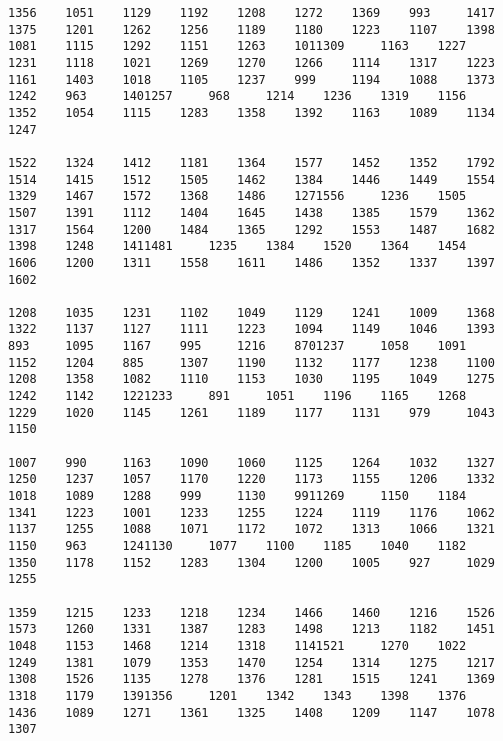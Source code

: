 \begin{verbatim}
1356    1051    1129    1192    1208    1272    1369    993     1417    1375    1201    1262    1256    1189    1180    1223    1107    1398    1081    1115    1292    1151    1263    1011309     1163    1227    1231    1118    1021    1269    1270    1266    1114    1317    1223    1161    1403    1018    1105    1237    999     1194    1088    1373    1242    963     1401257     968     1214    1236    1319    1156    1352    1054    1115    1283    1358    1392    1163    1089    1134    1247

1522    1324    1412    1181    1364    1577    1452    1352    1792    1514    1415    1512    1505    1462    1384    1446    1449    1554    1329    1467    1572    1368    1486    1271556     1236    1505    1507    1391    1112    1404    1645    1438    1385    1579    1362    1317    1564    1200    1484    1365    1292    1553    1487    1682    1398    1248    1411481     1235    1384    1520    1364    1454    1606    1200    1311    1558    1611    1486    1352    1337    1397    1602

1208    1035    1231    1102    1049    1129    1241    1009    1368    1322    1137    1127    1111    1223    1094    1149    1046    1393    893     1095    1167    995     1216    8701237     1058    1091    1152    1204    885     1307    1190    1132    1177    1238    1100    1208    1358    1082    1110    1153    1030    1195    1049    1275    1242    1142    1221233     891     1051    1196    1165    1268    1229    1020    1145    1261    1189    1177    1131    979     1043    1150

1007    990     1163    1090    1060    1125    1264    1032    1327    1250    1237    1057    1170    1220    1173    1155    1206    1332    1018    1089    1288    999     1130    9911269     1150    1184    1341    1223    1001    1233    1255    1224    1119    1176    1062    1137    1255    1088    1071    1172    1072    1313    1066    1321    1150    963     1241130     1077    1100    1185    1040    1182    1350    1178    1152    1283    1304    1200    1005    927     1029    1255

1359    1215    1233    1218    1234    1466    1460    1216    1526    1573    1260    1331    1387    1283    1498    1213    1182    1451    1048    1153    1468    1214    1318    1141521     1270    1022    1249    1381    1079    1353    1470    1254    1314    1275    1217    1308    1526    1135    1278    1376    1281    1515    1241    1369    1318    1179    1391356     1201    1342    1343    1398    1376    1436    1089    1271    1361    1325    1408    1209    1147    1078    1307


\end{verbatim}
